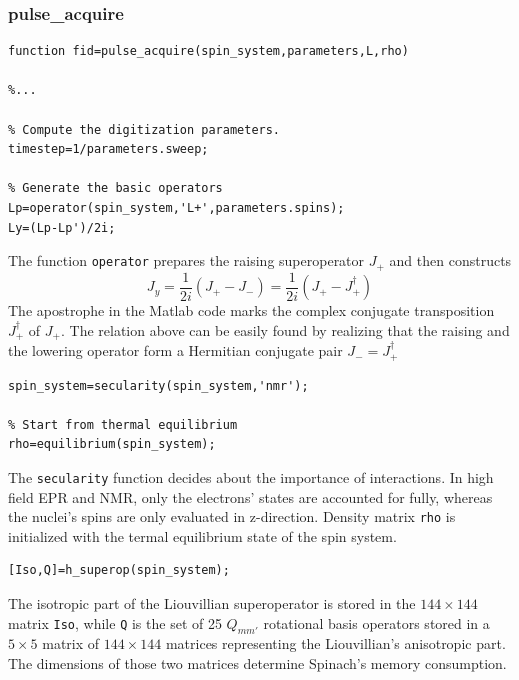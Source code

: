 \documentclass[11.5pt,a4paper]{article}
\begin{document}

\subsubsection{pulse\_acquire}
\label{sec-pulse-acquire}

\begin{lstlisting}
function fid=pulse_acquire(spin_system,parameters,L,rho)

%...

% Compute the digitization parameters.
timestep=1/parameters.sweep;

% Generate the basic operators
Lp=operator(spin_system,'L+',parameters.spins);
Ly=(Lp-Lp')/2i;
\end{lstlisting}
The function \verb$operator$ prepares the raising superoperator $J_+$ and then constructs
\begin{equation}
  J_y = \frac{1}{2i} ( J_+ - J_- ) = \frac{1}{2i} ( J_+ - J_+^\dagger )
\end{equation}
The apostrophe in the Matlab code marks the complex conjugate transposition $J_+^\dagger$ of $J_+$. The relation above can be easily found by realizing that the raising and the lowering operator form a Hermitian conjugate pair $J_- = J_+^\dagger$

\begin{lstlisting}[firstnumber=last]
% Set the secularity assumptions
spin_system=secularity(spin_system,'nmr');

% Start from thermal equilibrium
rho=equilibrium(spin_system);
\end{lstlisting}
The \verb$secularity$ function decides about the importance of interactions. In high field EPR and NMR, only the electrons' states are accounted for fully, whereas the nuclei's spins are only evaluated in z-direction. Density matrix \verb$rho$ is initialized with the termal equilibrium state of the spin system.

\begin{lstlisting}[firstnumber=last]
[Iso,Q]=h_superop(spin_system);
\end{lstlisting}

The isotropic part of the Liouvillian superoperator is stored in the $144\times144$ matrix \verb$Iso$, while \verb$Q$ is the set of 25 $Q_{mm'}$ rotational basis operators stored in a $5\times5$ matrix of $144\times144$ matrices representing the Liouvillian's anisotropic part. The dimensions of those two matrices determine Spinach's memory consumption.
\end{document}
